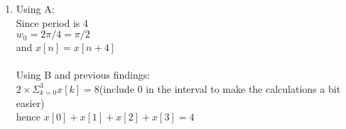 \documentclass[10pt,a4paper, margin=1in]{article}
\begin{document}
\begin{enumerate}
\begin{enumerate}
    \item %
        (i) \\
        \begin{center}
            $y[n] = x[n] - \sum_{k=-\infty}^{\infty}\delta[n-3+4k] $ \\
        \end{center}
        (ii) To find the coefficient, it is enough to find $a_0,a_1,a_2,a_3$. Again using the formula in the part a;
        \begin{center}
            $a_0 =  1/4\sum_{n = <N>} y[n]e^{-j0\pi/2n} = 3/4$ \\
            $a_1 =  1/4\sum_{n = <N>} y[n]e^{-j\pi/2n} = -1/4(j+2)$ \\
            $a_2 =  1/4\sum_{n = <N>} y[n]e^{-j2\pi/2n} = 1/4$ \\
            $a_3 =  1/4\sum_{n = <N>} y[n]e^{-j0\pi/2n} = 1/4(j-2)$ \\
        \end{center}
        \begin{figure} [H]
    \centering
    \caption{$k$ vs. $|a_k|$.}
    \label{fig:q1b}
\end{figure}
\end{enumerate}
\item
Using A: \\
Since period is 4 \\
$ w_0 =2 \pi / 4= \pi / 2 $ \\
and $ x[n]=x[n+4] $ \\
\\
Using B and previous findings: \\
$2 \times \Sigma_{k=0}^{3}x[k]=8 $(include 0 in the interval to make the calculations a bit easier) \\
hence $ x[0]+x[1]+x[2]+x[3]=4$ \\

\end{enumerate}
\end{document}
